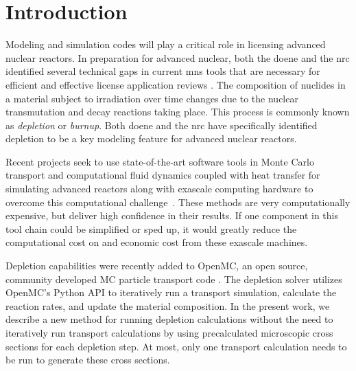 \section{Introduction}\label{}
    Modeling and simulation codes will play a critical role in licensing
    advanced nuclear reactors. In preparation for advanced nuclear, both the
    \Gls{doene} and the \Gls{nrc} identified several technical gaps in current
    \Gls{mns} tools that are necessary for efficient and effective license
    application reviews \citep{betzler_modeling_2019, usnrc_nonlwr_2020-1}.
    The composition of nuclides in a material subject to irradiation over time
    changes due to the nuclear transmutation and decay reactions taking place.
    This process is commonly known as {\it depletion} or {\it burnup}.  Both
    \Gls{doene} and the \Gls{nrc} have specifically identified depletion to be a
    key modeling feature for advanced nuclear reactors.

    Recent projects seek to use state-of-the-art software tools in Monte Carlo
    transport and computational fluid dynamics coupled with heat transfer for
    simulating advanced reactors along with exascale computing hardware to
    overcome this computational challenge~\citep{romano2021nse,merzari2023sc}.
    These methods are very computationally expensive, but deliver high
    confidence in their results. If one component in this tool chain could be
    simplified or sped up, it would greatly reduce the computational cost on and
    economic cost from these exascale machines.

    Depletion capabilities were recently added to OpenMC, an open source,
    community developed MC particle transport code \citep{romano_openmc_2015,
    romano_depletion_2021}. The depletion solver utilizes OpenMC's Python API to
    iteratively run a transport simulation, calculate the reaction rates, and
    update the material composition. In the present work, we describe a new
    method for running depletion calculations without the need to iteratively
    run transport calculations by using precalculated microscopic cross sections
    for each depletion step. At most, only one transport calculation needs to be
    run to generate these cross sections.

